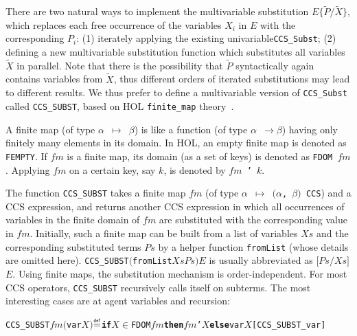 \documentclass[GCNS]{yincog}
\renewcommand{\HOLinline}[1]{\mbox{\textup{\texttt{#1}}}}
\renewcommand{\HOLConst}[1]{\texttt{#1}}
\renewcommand{\HOLTyOp}[1]{\texttt{#1}}
\renewcommand{\HOLFreeVar}[1]{\ensuremath{\mathit{#1}}}
\renewcommand{\HOLKeyword}[1]{{\textbf{\textsf{#1}}}}
\renewcommand{\HOLSymConst}[1]{#1}
\renewcommand{\HOLTokenIn}{\ensuremath{\in}}
\renewcommand{\HOLTokenMapto}{\ensuremath{\mapsto}}
\renewcommand{\HOLTokenDefEquality}{\ensuremath{\mathrel{\overset{\makebox [0pt]{\text{\tiny \textsf{def}}}}{=}}}}
\theoremstyle{remark}
\theoremstyle{theorem}
\theoremstyle{remark}
\newcommand{\HOLTokenTransEnd}{$\rightarrow$\xspace}
\newcommand{\univariate}{univariable\xspace}
\newcommand{\multivariate}{multivariable\xspace}
\renewcommand{\tilde}{\widetilde}
\newcommand{\til}{\tilde}
\begin{document}
There are two natural ways to implement the \multivariate substitution
$E\{\til P/\til X\}$, which replaces each free occurrence of the variables
$X_i$ in $E$ with the corresponding $P_i$: (1) iterately applying the existing
\univariate \HOLinline{\HOLConst{CCS\_Subst}}; (2) defining a new
\multivariate substitution function which substitutes all variables
$\til X$ in parallel. Note that there is the possibility that
$\til P$ syntactically again contains variables from $\til X$, thus different
orders of iterated substitutions may lead to different results. We thus
prefer to define a \multivariate version of
\HOLinline{\HOLConst{CCS\_Subst}} called
\HOLinline{\HOLConst{CCS\_SUBST}}, based on HOL \texttt{finite\_map} theory~\cite{holdesc}.

A finite map (of type
\HOLinline{\ensuremath{\alpha} \HOLTokenMapto{} \ensuremath{\beta}}) is
like a function (of type
\HOLinline{\ensuremath{\alpha} \HOLTokenTransEnd \ensuremath{\beta}}) having
only finitely many elements in its domain. In HOL, an empty finite map
is denoted as \HOLinline{\HOLConst{FEMPTY}}. If
\HOLinline{\HOLFreeVar{fm}} is a finite map, its domain (as a set of keys)
is denoted as \HOLinline{\HOLConst{FDOM} \HOLFreeVar{fm}}. Applying
\HOLinline{\HOLFreeVar{fm}} on a certain key, say $k$, is denoted by
\HOLinline{\HOLFreeVar{fm} \HOLConst{'} \HOLFreeVar{k}}.

The function \HOLinline{\HOLConst{CCS\_SUBST}} takes a finite map
\HOLinline{\HOLFreeVar{fm}} (of type
\HOLinline{\ensuremath{\alpha} \HOLTokenMapto{} \ensuremath{(}\ensuremath{\alpha}, \ensuremath{\beta}\ensuremath{)} \HOLTyOp{CCS}})
and a CCS expression, and returns another CCS expression in which all occurrences
of variables in the finite domain of \HOLinline{\HOLFreeVar{fm}} are substituted
with the corresponding value in \HOLinline{\HOLFreeVar{fm}}. Initially,
such a finite map can be built from a list of variables
\HOLinline{\HOLFreeVar{Xs}} and the corresponding substituted terms
\HOLinline{\HOLFreeVar{Ps}} by a helper function
\HOLinline{\HOLConst{fromList}} (whose details are omitted here).
\HOLinline{\HOLConst{CCS\_SUBST}\\\;\ensuremath{(}\HOLConst{fromList}\\\;\HOLFreeVar{Xs}\\\;\HOLFreeVar{Ps}\ensuremath{)}\\\;\HOLFreeVar{E}}
is usually abbreviated as
\HOLinline{\ensuremath{[}\HOLFreeVar{Ps}\ensuremath{/}\HOLFreeVar{Xs}\ensuremath{]}\\\;\HOLFreeVar{E}}.
Using finite maps, the substitution mechanism is order-independent. For
most CCS operators, \HOLinline{\HOLConst{CCS\_SUBST}} recursively calls
itself on subterms. The most interesting cases are at agent variables and
recursion:
%
\begin{alltt}
   \HOLConst{CCS\_SUBST} \HOLFreeVar{fm} \ensuremath{(}\HOLConst{var} \HOLFreeVar{X}\ensuremath{)} \HOLTokenDefEquality{} \HOLKeyword{if} \HOLFreeVar{X} \HOLSymConst{\HOLTokenIn{}} \HOLConst{FDOM} \HOLFreeVar{fm} \HOLKeyword{then} \HOLFreeVar{fm} \HOLConst{'} \HOLFreeVar{X} \HOLKeyword{else} \HOLConst{var} \HOLFreeVar{X}\hfill{[CCS\_SUBST\_var]}
\end{alltt}
\end{document}
